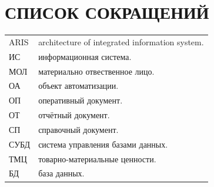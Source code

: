 \documentclass[12pt, a4paper, simple]{eskdtext}
\begin{document}
    \section*{СПИСОК СОКРАЩЕНИЙ}
    
    \begin{tabular}{ll} 
        ARIS    & architecture of integrated information system.\\
        ИС      & информационная система.\\
        МОЛ     & материально отвественное лицо.\\
        ОА      & объект автоматизации.\\
        ОП      & оперативный документ.\\
        ОТ      & отчётный документ.\\
        СП      & справочный документ.\\
        СУБД    & система управления базами данных.\\
        ТМЦ     & товарно-материальные ценности.\\
        БД      & база данных.\\
    \end{tabular}
    
    \newpage
\end{document}
